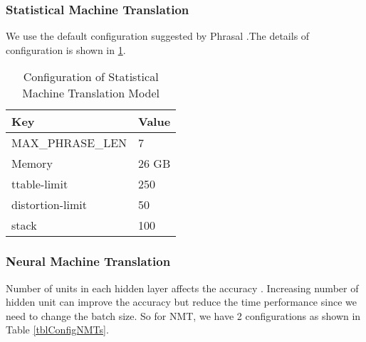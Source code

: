 \subsubsection{Statistical Machine Translation}
We use the default configuration suggested by Phrasal \cite{021}.The details of configuration is shown in \ref{tblConfigSMT}.
\begin{table}[]
\small
\centering
\begin{tabular}{|l|l|}
\hline
\textbf{Key }             & \textbf{Value} \\ \hline
MAX\_PHRASE\_LEN & 7     \\ \hline
Memory           & 26 GB \\ \hline
ttable-limit     & 250   \\ \hline
distortion-limit & 50    \\ \hline
stack            & 100   \\ \hline
\end{tabular}
\caption{Configuration of Statistical Machine Translation Model}
\label{tblConfigSMT}
\end{table}

\subsubsection{Neural Machine Translation}
Number of units in each hidden layer affects the accuracy \cite{047}. Increasing number of hidden unit can improve the accuracy but reduce the time performance since we need to change the batch size. So for NMT, we have 2 configurations as shown in Table \ref{tblConfigNMTs}.





